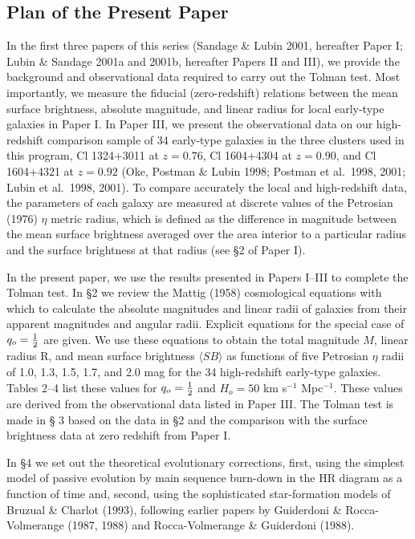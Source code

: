 \documentclass[preprint]{aastex}
\begin{document}
\subsection{Plan of the Present Paper}

In the first three papers of this series (Sandage \& Lubin 2001,
hereafter Paper I; Lubin \& Sandage 2001a and 2001b, hereafter Papers
II and III), we provide the background and observational data required
to carry out the Tolman test.  Most importantly, we measure the
fiducial (zero-redshift) relations between the mean surface
brightness, absolute magnitude, and linear radius for local early-type
galaxies in Paper I. In Paper III, we present the observational data
on our high-redshift comparison sample of 34 early-type galaxies in
the three clusters used in this program, Cl 1324+3011 at $z = 0.76$,
Cl 1604+4304 at $z = 0.90$, and Cl 1604+4321 at $z = 0.92$ (Oke,
Postman \& Lubin 1998; Postman et al.\ 1998, 2001; Lubin et al.\ 1998,
2001).  To compare accurately the local and high-redshift data, the
parameters of each galaxy are measured at discrete values of the
Petrosian (1976) $\eta$ metric radius, which is defined as the
difference in magnitude between the mean surface brightness averaged
over the area interior to a particular radius and the surface
brightness at that radius (see \S2 of Paper I).

In the present paper, we use the results presented in Papers I--III to
complete the Tolman test. In \S 2 we review the Mattig (1958)
cosmological equations with which to calculate the absolute magnitudes
and linear radii of galaxies from their apparent magnitudes and
angular radii. Explicit equations for the special case of $q_o =
{1\over{2}}$ are given. We use these equations to obtain the total
magnitude $M$, linear radius R, and mean surface brightness $\langle
SB \rangle$ as functions of five Petrosian $\eta$ radii of 1.0, 1.3,
1.5, 1.7, and 2.0 mag for the 34 high-redshift early-type galaxies.
Tables 2--4 list these values for $q_o = {1\over{2}}$ and $H_o = 50$
km s$^{-1}$ Mpc$^{-1}$.  These values are derived from the
observational data listed in Paper III.  The Tolman test is made in \S
3 based on the data in \S 2 and the comparison with the surface
brightness data at zero redshift from Paper I.

In \S 4 we set out the theoretical evolutionary corrections, first,
using the simplest model of passive evolution by main sequence
burn-down in the HR diagram as a function of time and, second, using
the sophisticated star-formation models of Bruzual \& Charlot (1993),
following earlier papers by Guiderdoni \& Rocca-Volmerange (1987,
1988) and Rocca-Volmerange \& Guiderdoni (1988).
\end{document}
